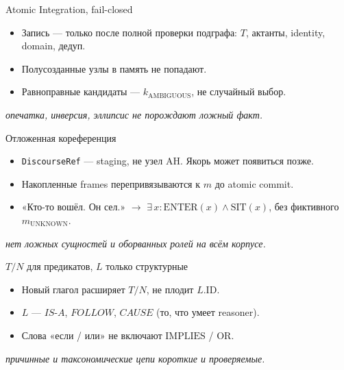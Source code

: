 \documentclass[aspectratio=169,11pt]{beamer}
\newcommand{\Lift}[1]{%
  {\scriptsize\textit{#1}}%
}
\begin{document}
\begin{frame}{Atomic Integration, fail-closed}
\begin{itemize}
  \item Запись --- только после полной проверки подграфа: $T$, актанты, identity, domain, дедуп.
  \item Полусозданные узлы в память не попадают.
  \item Равноправные кандидаты --- $k_{\mathrm{AMBIGUOUS}}$, не случайный выбор.
\end{itemize}
\vspace{0.5em}
\begin{center}
\end{center}
\Lift{опечатка, инверсия, эллипсис не порождают ложный факт.}
\end{frame}

\begin{frame}{Отложенная кореференция}
\begin{itemize}
  \item \texttt{DiscourseRef} --- staging, не узел AH. Якорь может появиться позже.
  \item Накопленные frames перепривязываются к $m$ до atomic commit.
  \item «Кто-то вошёл. Он сел.» $\to$ $\exists\,x\colon \mathrm{ENTER}(x)\land\mathrm{SIT}(x)$, без фиктивного $m_{\mathrm{UNKNOWN}}$.
\end{itemize}
\Lift{нет ложных сущностей и оборванных ролей на всём корпусе.}
\end{frame}

\begin{frame}{$T/N$ для предикатов, $L$ только структурные}
\begin{itemize}
  \item Новый глагол расширяет $T/N$, не плодит $L.\mathrm{ID}$.
  \item $L$ --- $IS\text{-}A$, $FOLLOW$, $CAUSE$ (то, что умеет reasoner).
  \item Слова «если / или» не включают $\mathrm{IMPLIES}$ / $\mathrm{OR}$.
\end{itemize}
\vspace{0.45em}
\begin{center}
\end{center}
\Lift{причинные и таксономические цепи короткие и проверяемые.}
\end{frame}
\end{document}
